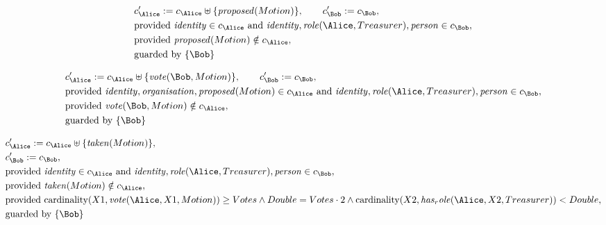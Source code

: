 \begin{align*}
&
c'_
{
\Alice
}
 := 
c_
{
\Alice
}
 \uplus 
\{
\mathit{
proposed
}
(
Motion
)
\}
, \qquad 
c'_
{
\Bob
}
 := 
c_
{
\Bob
}
,\\
&
\text{provided } 
\mathit{
identity
}
 \in c_
{
\Alice
}
 \text{ and } 
\mathit{
identity
}
,
\mathit{
role
}
(
\Alice
,
Treasurer
)
,
\mathit{
person
}
 \in c_
{
\Bob
}
,\\
&
\text{provided } 
\mathit{
proposed
}
(
Motion
)
 \notin c_
{
\Alice
}
,\\
&
\text{guarded by } \{
\Bob
\}
\end{align*}

\begin{align*}
&
c'_
{
\Alice
}
 := 
c_
{
\Alice
}
 \uplus 
\{
\mathit{
vote
}
(
\Bob
,
Motion
)
\}
, \qquad 
c'_
{
\Bob
}
 := 
c_
{
\Bob
}
,\\
&
\text{provided } 
\mathit{
identity
}
,
\mathit{
organisation
}
,
\mathit{
proposed
}
(
Motion
)
 \in c_
{
\Alice
}
 \text{ and } 
\mathit{
identity
}
,
\mathit{
role
}
(
\Alice
,
Treasurer
)
,
\mathit{
person
}
 \in c_
{
\Bob
}
,\\
&
\text{provided } 
\mathit{
vote
}
(
\Bob
,
Motion
)
 \notin c_
{
\Alice
}
,\\
&
\text{guarded by } \{
\Bob
\}
\end{align*}

\begin{align*}
&
c'_
{
\Alice
}
 := 
c_
{
\Alice
}
 \uplus 
\{
\mathit{
taken
}
(
Motion
)
\}
,\\
&
c'_
{
\Bob
}
 := 
c_
{
\Bob
}
,\\
&
\text{provided } 
\mathit{
identity
}
 \in c_
{
\Alice
}
 \text{ and } 
\mathit{
identity
}
,
\mathit{
role
}
(
\Alice
,
Treasurer
)
,
\mathit{
person
}
 \in c_
{
\Bob
}
,\\
&
\text{provided } 
\mathit{
taken
}
(
Motion
)
 \notin c_
{
\Alice
}
,\\
&
\text{provided } 
\mathrm{cardinality}(
X1
,
\mathit{
vote
}
(
\Alice
,
X1
,
Motion
)
)
\ge
Votes
\land
Double
=
Votes
\cdot
2
\land
\mathrm{cardinality}(
X2
,
\mathit{
has_role
}
(
\Alice
,
X2
,
Treasurer
)
)
<
Double
,\\
&
\text{guarded by } \{
\Bob
\}
\end{align*}

